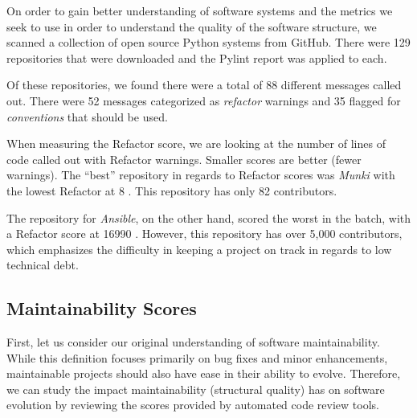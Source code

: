 \documentclass[12pt,conference]{IEEEtran}
\newcommand\todo[1]{\textcolor{red}{#1}}
\begin{document}
On order to gain better understanding of software systems and the metrics we seek to use in order to understand the quality of the software structure, we scanned a collection of open source Python systems from GitHub. There were 129 repositories that were downloaded and the Pylint report was applied to each.

Of these repositories, we found there were a total of 88 different messages called out. There were 52 messages categorized as \emph{refactor} warnings and 35 flagged for \emph{conventions} that should be used.

When measuring the Refactor score, we are looking at the number of lines of code called out with Refactor warnings. Smaller scores are better (fewer warnings). The ``best'' repository in regards to Refactor scores was \emph{Munki} with the lowest Refactor at 8 \cite{data:munki}. This repository has only 82 contributors.

The repository for \emph{Ansible}, on the other hand, scored the worst in the batch, with a Refactor score at 16990 \cite{data:ansible}. However, this repository has over 5,000 contributors, which emphasizes the difficulty in keeping a project on track in regards to low technical debt.



\vspace{0.25cm}
\subsection{Maintainability Scores} \label{sectionMaintainabilityScores}


First, let us consider our original understanding of software maintainability. While this definition focuses primarily on bug fixes and minor enhancements, maintainable projects should also have ease in their ability to evolve. Therefore, we can study the impact maintainability (structural quality) has on software evolution by reviewing the scores provided by automated code review tools.
\end{document}

